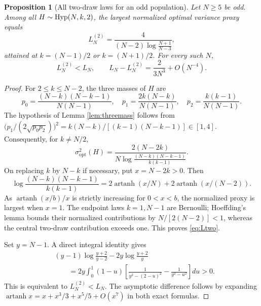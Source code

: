 \documentclass[11pt,a4paper]{article}
\newtheorem{proposition}[theorem]{Proposition}
\begin{document}
\begin{proposition}[All two-draw laws for an odd population]\label{prop:odd2}
Let $N\ge5$ be odd. Among all $H\sim\operatorname{Hyp}(N,k,2)$, the largest normalized optimal variance proxy equals
\begin{equation}\label{eq:Ltwo}
 L_N^{(2)}=\frac{4}{(N-2)\log\frac{N+1}{N-3}},
\end{equation}
attained at $k=(N-1)/2$ or $k=(N+1)/2$. For every such $N$,
\begin{equation}\label{eq:twostrict}
 L_N^{(2)}<L_N,
 \qquad L_N-L_N^{(2)}=\frac{2}{3N^3}+O(N^{-4}).
\end{equation}
\end{proposition}
\begin{proof}
For $2\le k\le N-2$, the three masses of $H$ are
\[
 p_0=\frac{(N-k)(N-k-1)}{N(N-1)},\quad
 p_1=\frac{2k(N-k)}{N(N-1)},\quad
 p_2=\frac{k(k-1)}{N(N-1)}.
\]
The hypothesis of Lemma \ref{lem:threemass} follows from
$\bigl(p_1/(2\sqrt{p_0p_2})\bigr)^2=k(N-k)/[(k-1)(N-k-1)]\in[1,4]$.
Consequently, for $k\ne N/2$,
\[
 \sigma^2_{\mathrm{opt}}(H)
 =\frac{2(N-2k)}{N\log\frac{(N-k)(N-k-1)}{k(k-1)}}.
\]
On replacing $k$ by $N-k$ if necessary, put $x=N-2k>0$. Then
\[
 \log\frac{(N-k)(N-k-1)}{k(k-1)}
 =2\operatorname{artanh}(x/N)+2\operatorname{artanh}(x/(N-2)).
\]
As $\operatorname{artanh}(x/b)/x$ is strictly increasing for $0<x<b$, the normalized proxy is largest when $x=1$. The endpoint laws $k=1,N-1$ are Bernoulli; Hoeffding's lemma bounds their normalized contributions by $N/[2(N-2)]<1$, whereas the central two-draw contribution exceeds one. This proves \eqref{eq:Ltwo}.

Set $y=N-1$. A direct integral identity gives
\begin{align*}
 &(y-1)\log\frac{y+2}{y-2}-2y\log\frac{y+2}{y}\\
 &\qquad=2y\int_0^1(1-u)
 \left[\frac1{y^2-(2-u)^2}-\frac1{y^2-u^2}\right]du>0.
\end{align*}
This is equivalent to $L_N^{(2)}<L_N$. The asymptotic difference follows by expanding $\operatorname{artanh}x=x+x^3/3+x^5/5+O(x^7)$ in both exact formulas.
\end{proof}
\end{document}

